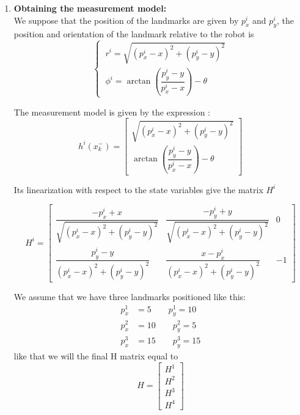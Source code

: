 \documentclass[11pt,a4paper]{report}
\begin{document}
\begin{enumerate}
\item \textbf{Obtaining the measurement model:}\\
We suppose that the position of the landmarks are given by $p_{x}^i$ and $p_{y}^i$, the position and orientation of the landmark relative to the robot is 
$$ \left \{\ \begin{array}{c} r^i= \sqrt{(p_{x}^i -x)^2 + (p_{y}^i -y)^2 } \\ \phi^i = \arctan (\dfrac{p_{y}^i - y}{p_{x}^i - x}) - \theta \end{array}  \right. $$ 

The measurement model is given by the expression :
$$ h^i (x_{k}^-)  = \left [ \begin{array}{c} \sqrt{(p_{x}^i -x)^2 + (p_{y}^i -y)^2 } \\ \arctan (\dfrac{p_{y}^i - y}{p_{x}^i - x}) - \theta \end{array}\right ] $$

Its linearization with respect to the state variables give the matrix $H^i$

$$ H^i = \left [ \begin{array}{ccc} \dfrac{-p_{x }^i+ x}{\sqrt{(p_{x}^i - x)^2 + (p_{y}^i-y)^2}}& \dfrac{-p_{y }^i+ y}{\sqrt{(p_{x}^i - x)^2 + (p_{y}^i-y)^2}} & 0 \\ 
 \dfrac{p_{y}^i - y}{(p_{x}^i - x)^2 + (p_{y}^i-y)^2}& \dfrac{x -p_{x}^i}{(p_{x}^i - x)^2 + (p_{y}^i-y)^2} & -1 
\end{array}  \right] $$ 

We assume that we have three landmarks positioned  like this:
\begin{align*}
p_{x}^1 &= 5 \qquad p_{y}^1 = 10\\
p_{x}^2 &= 10 \qquad p_{y}^2 = 5\\
p_{x}^3 &= 15 \qquad p_{y}^3 = 15
\end{align*}  
like that we will the final H matrix equal to 
$$ H =\left [ \begin{array}{ccc} H^1 \\H^2 \\H^3  \\H^4 \end{array}  \right] $$
 

\end{enumerate}
\end{document}
